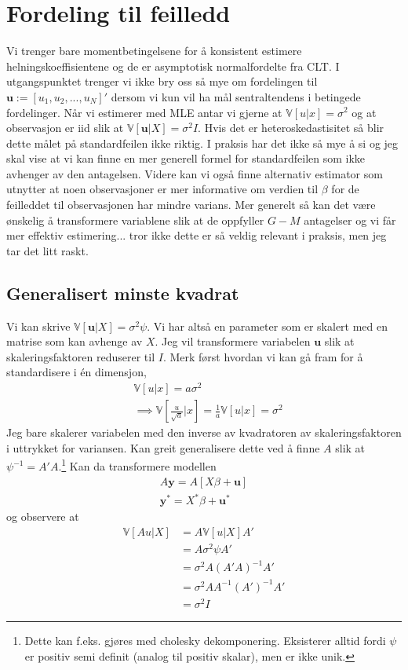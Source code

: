 \section{Fordeling til feilledd}
Vi trenger bare momentbetingelsene for å konsistent estimere helningskoeffisientene og de er asymptotisk normalfordelte fra CLT. I utgangspunktet trenger vi ikke bry oss så mye om fordelingen til $\mathbf{u} := [u_1,u_2,...,u_N]'$ dersom vi kun vil ha mål sentraltendens i betingede fordelinger. Når vi estimerer med MLE antar vi gjerne at $\mathbb{V}[u|x]=\sigma^2$ og at observasjon er iid slik at $\mathbb{V}[\mathbf{u}|X] = \sigma^2I$. Hvis det er heteroskedastisitet så blir dette målet på standardfeilen ikke riktig. I praksis har det ikke så mye å si og jeg skal vise at vi kan finne en mer generell formel for standardfeilen som ikke avhenger av den antagelsen. Videre kan vi også finne alternativ estimator som utnytter at noen observasjoner er mer informative om verdien til $\beta$ for de feilleddet til observasjonen har mindre varians. Mer generelt så kan det være ønskelig å transformere variablene slik at de oppfyller $G-M$ antagelser og vi får mer effektiv estimering... tror ikke dette er så veldig relevant i praksis, men jeg tar det litt raskt.
\subsection{Generalisert minste kvadrat}
Vi kan skrive $\mathbb{V}[\mathbf{u}|X] = \sigma^2\psi$. Vi har altså en parameter som er skalert med en matrise som kan avhenge av $X$. Jeg vil transformere variabelen $\mathbf{u}$ slik at skaleringsfaktoren reduserer til $I$. Merk først hvordan vi kan gå fram for å standardisere i én dimensjon,
\begin{align}
&\mathbb{V}[u|x]=a\sigma^2 \\
&\implies \mathbb{V}[\frac{u}{\sqrt{a}}|x]=\frac{1}{a}\mathbb{V}[u|x]=\sigma^2
\end{align}
Jeg bare skalerer variabelen med den inverse av kvadratoren av skaleringsfaktoren i uttrykket for variansen. Kan greit generalisere dette ved å finne $A$ slik at $\psi^{-1}=A'A$.\footnote{Dette kan f.eks. gjøres med cholesky dekomponering. Eksisterer alltid fordi $\psi$ er positiv semi definit (analog til positiv skalar), men er ikke unik.} Kan da transformere modellen
\begin{align}
A\mathbf{y} = A[X\beta+\mathbf{u}] \\
\mathbf{y}^* = X^*\beta +\mathbf{u}^*
\end{align}
og observere at 
\begin{align}
\mathbb{V}[Au|X] &= A\mathbb{V}[u|X]A' \\
&=A\sigma^2\psi A' \\
&=\sigma^2A(A'A)^{-1}A' \\
&=\sigma^2AA^{-1}(A')^{-1}A' \\
&=\sigma^2I
\end{align}
